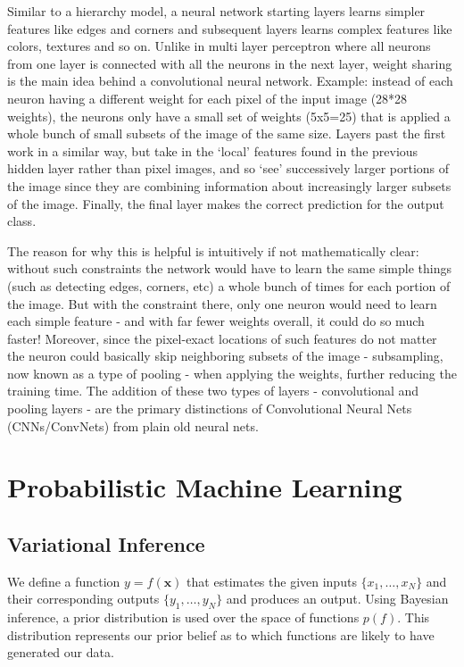 Similar to a hierarchy model, a neural network starting layers learns simpler features like edges and corners and subsequent layers learns complex features like colors, textures and so on. Unlike in multi layer perceptron where all neurons from one layer is connected with all the neurons in the next layer, weight sharing is the main idea behind a convolutional neural network. 
Example: instead of each neuron having a different weight for each pixel of the input image (28*28 weights), the neurons only have a small set of weights (5x5=25) that is applied a whole bunch of small subsets of the image of the same size. Layers past the first work in a similar way, but take in the ‘local’ features found in the previous hidden layer rather than pixel images, and so ‘see’ successively larger portions of the image since they are combining information about increasingly larger subsets of the image. Finally, the final layer makes the correct prediction for the output class.

The reason for why this is helpful is intuitively if not mathematically clear: without such constraints the network would have to learn the same simple things (such as detecting edges, corners, etc) a whole bunch of times for each portion of the image. But with the constraint there, only one neuron would need to learn each simple feature - and with far fewer weights overall, it could do so much faster! Moreover, since the pixel-exact locations of such features do not matter the neuron could basically skip neighboring subsets of the image - subsampling, now known as a type of pooling - when applying the weights, further reducing the training time. The addition of these two types of layers - convolutional and pooling layers - are the primary distinctions of Convolutional Neural Nets (CNNs/ConvNets) from plain old neural nets.


\section{Probabilistic Machine Learning}
\subsection{Variational Inference}

We define a function $y = f(\mathbf{x})$ that estimates the given inputs $\{ x_1, \hdots, x_N \}$ and their corresponding outputs $\{y_1, \hdots, y_N\}$ and produces an output. Using Bayesian inference, a prior distribution is used over the space of functions $p(f)$. This distribution represents our prior belief as to which functions are likely to have generated our data. 

